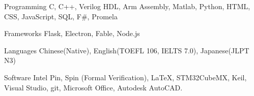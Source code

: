 
\begin{cvskills}
  \cvskill
    {Programming} %
    {C, C++, Verilog HDL, Arm Assembly, Matlab, Python, HTML, CSS, JavaScript, SQL, F\#, Promela} %

  \cvskill
    {Frameworks} %
    {Flask, Electron, Fable, Node.js} %
    
  \cvskill
    {Languages}
    {Chinese(Native), English(TOEFL 106, IELTS 7.0), Japanese(JLPT N3)}
    
  \cvskill
    {Software} %
    {Intel Pin, Spin (Formal Verification), LaTeX, STM32CubeMX, Keil, Visual Studio, git, Microsoft Office,  Autodesk AutoCAD.} %
\end{cvskills}
